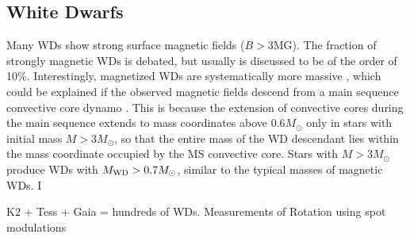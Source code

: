 {\color{red} \subsection{White Dwarfs}}
Many WDs show strong surface magnetic fields ($B>$3MG). The fraction of strongly magnetic WDs is debated, but usually is discussed to be of the order of 10\%. Interestingly, magnetized WDs are systematically more massive \cite{Ferrario_2015}, which could be explained if the observed magnetic fields descend from a main sequence convective core dynamo \cite{Cantiello_2016}. This is because the extension of convective cores during the main sequence extends to mass coordinates above 0.6$M_\odot$ only in stars with initial mass $M>3M_\odot$, so that the entire mass of the WD descendant lies within the mass coordinate occupied by the MS convective core. Stars with $M>3M_\odot$ produce WDs with $M_{\rm WD}>0.7M_\odot$, similar to the typical masses of magnetic WDs. I

K2 + Tess + Gaia = hundreds of WDs. Measurements of Rotation using spot modulations